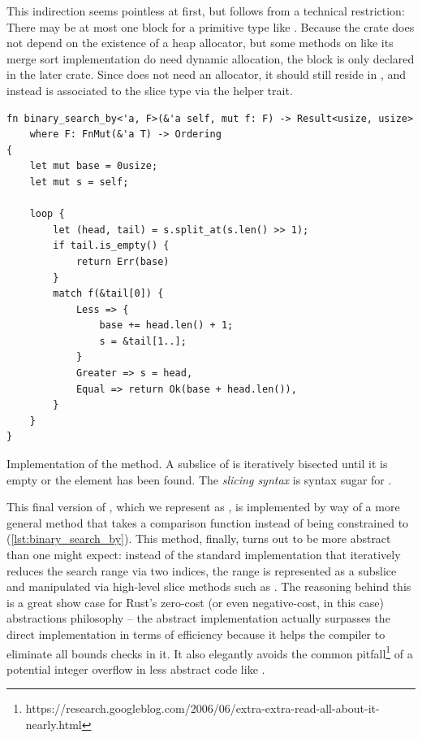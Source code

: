 This indirection seems pointless at first, but follows from a technical
restriction: There may be at most one  block for a primitive type
like \rust{[T]}. Because the  crate does not depend on the existence
of a heap allocator, but some methods on \rust{[T]} like its merge sort
implementation do need dynamic allocation, the  block is only
declared in the later  crate. Since  does
not need an allocator, it should still reside in , and instead is
associated to the slice type via the helper trait.

\begin{listing}[!bt]
\begin{verbatim}
fn binary_search_by<'a, F>(&'a self, mut f: F) -> Result<usize, usize>
    where F: FnMut(&'a T) -> Ordering
{
    let mut base = 0usize;
    let mut s = self;

    loop {
        let (head, tail) = s.split_at(s.len() >> 1);
        if tail.is_empty() {
            return Err(base)
        }
        match f(&tail[0]) {
            Less => {
                base += head.len() + 1;
                s = &tail[1..];
            }
            Greater => s = head,
            Equal => return Ok(base + head.len()),
        }
    }
}
\end{verbatim}
  
\caption{Implementation of the  method. A subslice
   of  is iteratively bisected until it is empty or the
  element has been found. The  \emph{slicing syntax} is
  syntax sugar for .}
\label{lst:binary_search_by}
\end{listing}

This final version of , which we represent as
, is implemented by way of a more
general method  that takes a comparison function instead
of being constrained to  (\autoref{lst:binary_search_by}). This
method, finally, turns out to be more abstract than one might expect: instead of
the standard implementation that iteratively reduces the search range via two
indices, the range is represented as a subslice and manipulated via high-level
slice methods such as . The reasoning behind this is a great show
case for Rust's zero-cost (or even negative-cost, in this case) abstractions
philosophy -- the abstract implementation actually surpasses the direct
implementation in terms of efficiency because it helps the compiler to eliminate
all bounds checks in it. It also elegantly avoids the common
pitfall\footnote{https://research.googleblog.com/2006/06/extra-extra-read-all-about-it-nearly.html}
of a potential integer overflow in less abstract code like .

